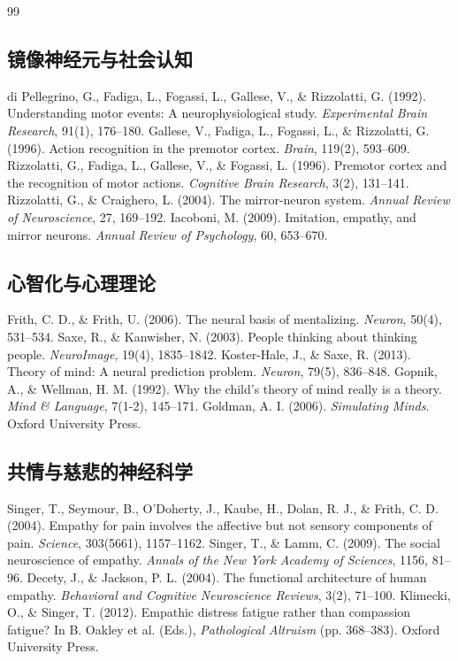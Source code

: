 \documentclass[UTF8,12pt,a4paper]{ctexart}
\begin{document}
\begin{thebibliography}{99}

\subsection*{镜像神经元与社会认知}
 di Pellegrino, G., Fadiga, L., Fogassi, L., Gallese, V., \& Rizzolatti, G. (1992). Understanding motor events: A neurophysiological study. \textit{Experimental Brain Research}, 91(1), 176--180.
 Gallese, V., Fadiga, L., Fogassi, L., \& Rizzolatti, G. (1996). Action recognition in the premotor cortex. \textit{Brain}, 119(2), 593--609.
 Rizzolatti, G., Fadiga, L., Gallese, V., \& Fogassi, L. (1996). Premotor cortex and the recognition of motor actions. \textit{Cognitive Brain Research}, 3(2), 131--141.
 Rizzolatti, G., \& Craighero, L. (2004). The mirror-neuron system. \textit{Annual Review of Neuroscience}, 27, 169--192.
 Iacoboni, M. (2009). Imitation, empathy, and mirror neurons. \textit{Annual Review of Psychology}, 60, 653--670.

\subsection*{心智化与心理理论}
 Frith, C. D., \& Frith, U. (2006). The neural basis of mentalizing. \textit{Neuron}, 50(4), 531--534.
 Saxe, R., \& Kanwisher, N. (2003). People thinking about thinking people. \textit{NeuroImage}, 19(4), 1835--1842.
 Koster-Hale, J., \& Saxe, R. (2013). Theory of mind: A neural prediction problem. \textit{Neuron}, 79(5), 836--848.
 Gopnik, A., \& Wellman, H. M. (1992). Why the child's theory of mind really is a theory. \textit{Mind \& Language}, 7(1-2), 145--171.
 Goldman, A. I. (2006). \textit{Simulating Minds}. Oxford University Press.

\subsection*{共情与慈悲的神经科学}
 Singer, T., Seymour, B., O'Doherty, J., Kaube, H., Dolan, R. J., \& Frith, C. D. (2004). Empathy for pain involves the affective but not sensory components of pain. \textit{Science}, 303(5661), 1157--1162.
 Singer, T., \& Lamm, C. (2009). The social neuroscience of empathy. \textit{Annals of the New York Academy of Sciences}, 1156, 81--96.
 Decety, J., \& Jackson, P. L. (2004). The functional architecture of human empathy. \textit{Behavioral and Cognitive Neuroscience Reviews}, 3(2), 71--100.
 Klimecki, O., \& Singer, T. (2012). Empathic distress fatigue rather than compassion fatigue? In B. Oakley et al. (Eds.), \textit{Pathological Altruism} (pp. 368--383). Oxford University Press.


\end{thebibliography}
\end{document}
